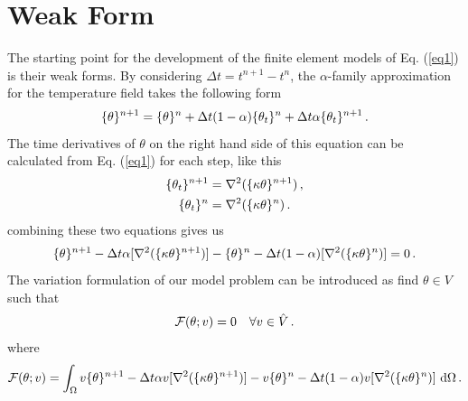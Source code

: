 \documentclass[]{article}
\begin{document}
\section{Weak Form} \label{sec: WF}
The starting point for the development of the finite element models of Eq. (\ref{eq1}) is their weak forms. By considering $\Delta t = t^{n+1} - t^{n}$, the $\alpha$-family approximation for the temperature field takes the following form
\begin{equation}\label{eq5}
	\begin{aligned}
		\{\theta\}^{n+1} = \{\theta\}^n + \Delta t(1 - \alpha)\{\theta_t\}^n + \Delta t\alpha\{\theta_t\}^{n+1}\thinspace.
	\end{aligned}
\end{equation}
The time derivatives of $\theta$ on the right hand side of this equation can be calculated from Eq. (\ref{eq1}) for each step, like this 
\begin{equation}\label{eq6}
	\begin{aligned}
		\{\theta_t\}^{n+1} &= \nabla^2(\{\kappa \theta\}^{n+1})\thinspace, \\
		\{\theta_t\}^{n} &= \nabla^2 (\{\kappa \theta\}^{n})\thinspace. \
	\end{aligned}
\end{equation}
combining these two equations gives us
\begin{equation}\label{eq7}
	\begin{aligned}
		\{\theta\}^{n+1} -\Delta t\alpha[\nabla^2(\{\kappa \theta\}^{n+1})] - \{\theta\}^n - \Delta t(1 - \alpha)[\nabla^2(\{\kappa \theta\}^{n})]=0\thinspace.
	\end{aligned}
\end{equation}
The variation formulation of our model problem can be introduced as find $\theta \in V$ such that
\begin{equation}\label{eq8}
	\begin{aligned}
		\mathcal{F}(\theta;v) = 0 \quad \forall v \in \hat{V}\thinspace.
	\end{aligned}
\end{equation}
where
\begin{equation}\label{eq9}
	\begin{aligned}
		\mathcal{F}(\theta; v) =\int_{\Omega} v\{\theta\}^{n+1} -\Delta t\alpha v[\nabla^2(\{\kappa \theta\}^{n+1})] - v\{\theta\}^n - \Delta t(1 - \alpha)v[\nabla^2(\{\kappa \theta\}^{n})]\ \mathrm{d}\Omega \thinspace .
	\end{aligned}
\end{equation}
\end{document}
